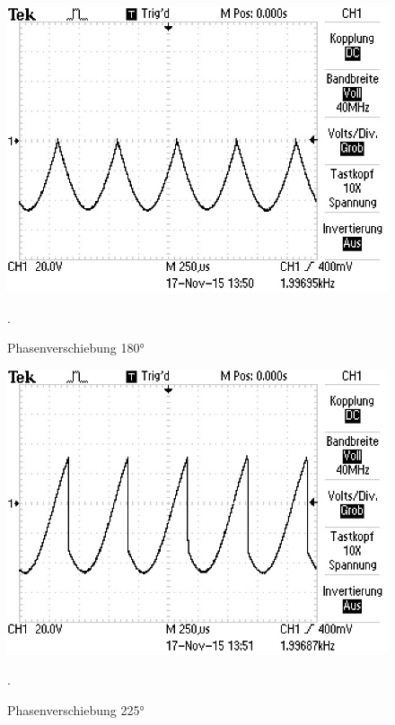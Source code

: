 \begin{figure}
  \centering
  \includegraphics[width=\textwidth]{bilder/Ohne Rauschen/3.JPG}
  \caption{Phasenverschiebung 180°}.
  \label{fig:bild3}
\end{figure}

\begin{figure}
  \centering
  \includegraphics[width=\textwidth]{bilder/Ohne Rauschen/4.JPG}
  \caption{Phasenverschiebung 225°}.
  \label{fig:bild4}
\end{figure}

